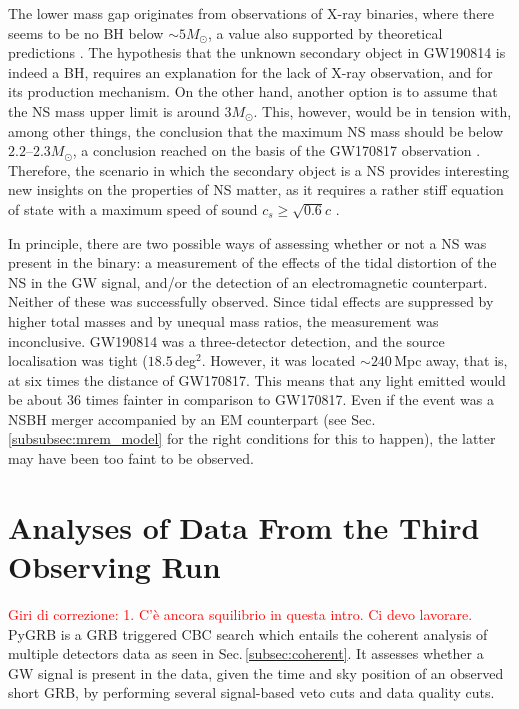 \documentclass[binding=0.6cm, LaM]{sapthesis}
\newcommand{\fpg}[1]{\textcolor{red}{#1} }
\begin{document}
	The lower mass gap originates from observations of X-ray binaries, 
	where there seems to be no BH below $\sim 5M_\odot$,
	a value also supported by theoretical predictions \cite{124}.
	The hypothesis that the unknown secondary object in GW190814 is indeed a BH, 
	requires an explanation for the lack of X-ray observation, 
	and for its production mechanism.
	On the other hand, another option is to assume that the NS mass upper limit is around $3M_\odot$.
	This, however, would be in tension with, among other things, the conclusion that 
        the maximum NS mass should be below $2.2$--$2.3M_\odot$, 
	a conclusion reached on the basis of the GW170817 observation \cite{122,123}.
	Therefore, the scenario in which the secondary object is a NS provides interesting new insights on the properties of NS matter, 
	as it requires a rather stiff equation of state with a maximum speed of sound $c_s \geq \sqrt{0.6}c$ \cite{121}.

	In principle, there are two possible ways of assessing whether or not a NS was present in the binary: 
	a measurement of the effects of the tidal distortion of the NS 
	in the GW signal, and/or the detection of an electromagnetic counterpart.
        Neither of these was successfully observed.
	Since tidal effects are suppressed by higher total masses 	
	and by unequal mass ratios, the measurement was inconclusive. 
	GW190814 was a three-detector detection, and the source localisation was tight ($18.5\,$deg$^2$.  
	However, it was located $\sim 240\,$Mpc away, that is,
	at six times the distance of GW170817.  
	This means that any light emitted would be about 36 times fainter in comparison to GW170817.
	Even if the event was a NSBH merger accompanied by an EM counterpart
	(see Sec.\,\ref{subsubsec:mrem_model} for the right conditions for this to happen), 
	the latter may have been too faint to be observed.

\chapter{Analyses of Data From the Third Observing Run}
\label{ch:datanalysis}
\fpg{Giri di correzione: 1.}%
\fpg{C'\`e ancora squilibrio in questa intro.  Ci devo lavorare.} %
        {\ttfamily PyGRB} is a GRB triggered CBC search
	which entails the coherent analysis of multiple detectors data as seen in Sec.\,\ref{subsec:coherent}. 
	It assesses whether a GW signal is present in the data, 
	given the time and sky position of an observed short GRB,
	by performing several signal-based veto cuts and data quality cuts.
\end{document}
